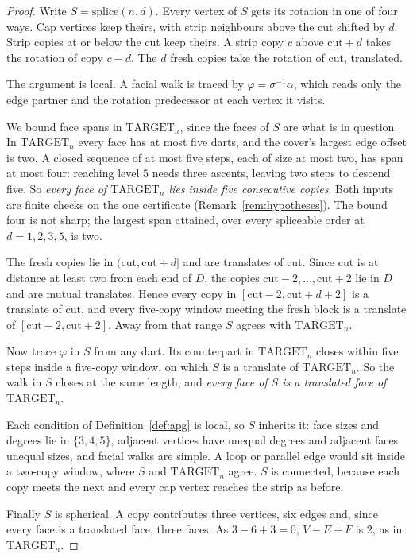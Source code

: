 \documentclass[11pt,a4paper]{amsart}
\theoremstyle{plain}
\theoremstyle{definition}
\begin{document}
\begin{proof}
Write $S = \mathrm{splice}(n,d)$. Every vertex of $S$ gets its rotation in one
of four ways. Cap vertices keep theirs, with strip neighbours above the cut
shifted by $d$. Strip copies at or below the cut keep theirs. A strip copy
$c$ above $\mathrm{cut}+d$ takes the rotation of copy $c-d$. The $d$ fresh
copies take the rotation of $\mathrm{cut}$, translated.

The argument is local. A facial walk is traced by
$\varphi = \sigma^{-1}\alpha$, which reads only the edge partner and the
rotation predecessor at each vertex it visits.

We bound face spans in $\mathrm{TARGET}_n$, since the faces of $S$ are what is
in question. In $\mathrm{TARGET}_n$ every face has at most five darts, and the
cover's largest edge offset is two. A closed sequence of at most five steps,
each of size at most two, has span at most four: reaching level $5$ needs three
ascents, leaving two steps to descend five. So \emph{every face of
$\mathrm{TARGET}_n$ lies inside five consecutive copies}. Both inputs are finite
checks on the one certificate (Remark~\ref{rem:hypotheses}). The bound four is
not sharp; the largest span attained, over every spliceable order at
$d = 1,2,3,5$, is two.

The fresh copies lie in $(\mathrm{cut}, \mathrm{cut}+d]$ and are translates of
$\mathrm{cut}$. Since $\mathrm{cut}$ is at distance at least two from each end
of $D$, the copies $\mathrm{cut}-2,\dots,\mathrm{cut}+2$ lie in $D$ and are
mutual translates. Hence every copy in $[\mathrm{cut}-2, \mathrm{cut}+d+2]$ is a
translate of $\mathrm{cut}$, and every five-copy window meeting the fresh block
is a translate of $[\mathrm{cut}-2,\mathrm{cut}+2]$. Away from that range $S$
agrees with $\mathrm{TARGET}_n$.

Now trace $\varphi$ in $S$ from any dart. Its counterpart in
$\mathrm{TARGET}_n$ closes within five steps inside a five-copy window, on
which $S$ is a translate of $\mathrm{TARGET}_n$. So the walk in $S$ closes at
the same length, and \emph{every face of $S$ is a translated face of
$\mathrm{TARGET}_n$}.

Each condition of Definition~\ref{def:apg} is local, so $S$ inherits it: face
sizes and degrees lie in $\{3,4,5\}$, adjacent vertices have unequal degrees and
adjacent faces unequal sizes, and facial walks are simple. A loop or parallel
edge would sit inside a two-copy window, where $S$ and $\mathrm{TARGET}_n$
agree. $S$ is connected, because each copy meets the next and every cap vertex
reaches the strip as before.

Finally $S$ is spherical. A copy contributes three vertices, six edges and,
since every face is a translated face, three faces. As $3-6+3=0$, $V-E+F$ is
$2$, as in $\mathrm{TARGET}_n$.
\end{proof}
\end{document}
